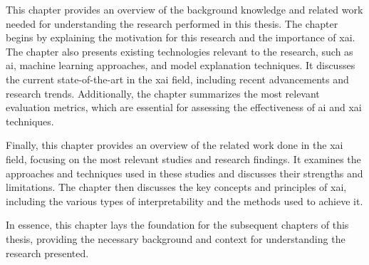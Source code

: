 \label{sec:2_background_all_content}

This chapter provides an overview of the background knowledge and related work needed for understanding the research performed in this thesis. The chapter begins by explaining the motivation for this research and the importance of \gls{xai}. 
The chapter also presents existing technologies relevant to the research, such as \gls{ai}, machine learning approaches, and model explanation techniques. It discusses the current state-of-the-art in the \gls{xai} field, including recent advancements and research trends. Additionally, the chapter summarizes the most relevant evaluation metrics, which are essential for assessing the effectiveness of \gls{ai} and \gls{xai} techniques.

Finally, this chapter provides an overview of the related work done in the \gls{xai} field, focusing on the most relevant studies and research findings. It examines the approaches and techniques used in these studies and discusses their strengths and limitations. 
The chapter then discusses the key concepts and principles of \gls{xai}, including the various types of interpretability and the methods used to achieve it.

In essence, this chapter lays the foundation for the subsequent chapters of this thesis, providing the necessary background and context for understanding the research presented.




